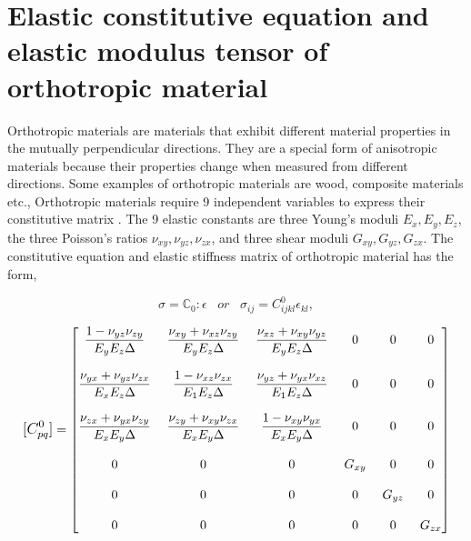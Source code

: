 \documentclass[12pt,openright,twoside]{report}
\begin{document}
\section{Elastic constitutive equation and elastic modulus tensor of orthotropic material}\label{Constitutive matrix}
\indent\indent\indent Orthotropic materials are materials that exhibit different material properties in the mutually perpendicular directions. They are a special form of anisotropic materials because their properties change when measured from different directions. Some examples of orthotropic materials are wood, composite materials etc., Orthotropic materials require 9 independent variables to express their constitutive matrix \citep{ortho}. The 9 elastic constants are three Young's moduli $E_{x},E_{y},E_{z}$, the three Poisson's ratios $\nu_{xy},\nu_{yz},\nu_{zx}$, and three shear moduli $G_{xy},G_{yz},G_{zx}$. The constitutive equation and elastic stiffness matrix of orthotropic material \citep{lempriere1968poisson} has the form,

\begin{equation}
  \sigma = \mathbb{C}_{0} : \epsilon \;\;\;   or \;\;\;  \sigma_{ij}  =  C^{0}_{ijkl}\epsilon_{kl},
\end{equation}

$$
\mathlarger{ [C^{0}_{pq}]} =  
 \begin{bmatrix}
 \mathlarger{ \frac{1 - \nu_{yz}\nu_{zy}}{E_{y}E_{z}\Delta} } \;&  \mathlarger{  \frac{\nu_{xy} + \nu_{xz}\nu_{zy}}{E_{y}E_{z}\Delta}}   \;& \mathlarger{  \frac{\nu_{xz} + \nu_{xy}\nu_{yz}}{E_{y}E_{z}\Delta} }  \;&  \mathlarger{  0}  \;&  \mathlarger{ 0}  \;& \mathlarger{  0}  \\
 \\
    \mathlarger{ \frac{\nu_{yx} + \nu_{yz}\nu_{zx}}{E_{x}E_{z}\Delta} }  \;& \mathlarger{  \frac{1 - \nu_{xz}\nu_{zx}}{E_{1}E_{z}\Delta} }\; & \mathlarger{ \frac{\nu_{yz} +\nu_{yx}\nu_{xz}}{E_{1}E_{z}\Delta} } \; & \mathlarger{ 0}\; &\mathlarger{  0}\; & \mathlarger{ 0}\\
  \\
   \mathlarger{  \frac{\nu_{zx} + \nu_{yx}\nu_{zy}}{E_{x}E_{y}\Delta}}  \;& \mathlarger{   \frac{\nu_{zy} + \nu_{xy}\nu_{zx}}{E_{x}E_{y}\Delta} }\;&\mathlarger{  \frac{1 - \nu_{xy}\nu_{yx}}{E_{x}E_{y}\Delta} } \;&\mathlarger{  0 }\;& \mathlarger{ 0 }\;&\mathlarger{  0} \\ 
\\

 
 \mathlarger{  0} \;&  \mathlarger{  0 } \;&  \mathlarger{  0 }\;&\mathlarger{ G_{xy}} \;& \mathlarger{0} \;& \mathlarger{0} \\
  \\
 \mathlarger{ 0} \;&  \mathlarger{  0 }\;&  \mathlarger{  0 } \;& \mathlarger{0 }\;& \mathlarger{ G_{yz} }\;&\mathlarger{ 0} \\
  \\
  \mathlarger{0}\;&  \mathlarger{  0 } \;&  \mathlarger{  0 } \;& \mathlarger{0 }\;& \mathlarger{0} \;& \mathlarger{G_{zx}} 
 \end{bmatrix}
 $$\\
 
\end{document}
